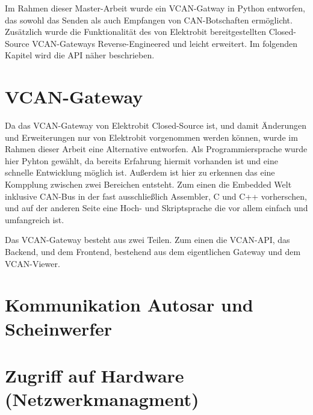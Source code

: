 \documentclass[
  a4paper,					    %
  twoside,
  DIV=calc,     				%
  bibliography=totoc,
  cleardoublepage=empty,
  ngerman,     					%
  final       					%
]{scrbook}
\begin{document}
Im Rahmen dieser Master-Arbeit wurde ein VCAN-Gatway in Python entworfen, das sowohl das Senden als auch Empfangen von CAN-Botschaften ermöglicht. Zusätzlich wurde die Funktionalität des von Elektrobit bereitgestellten Closed-Source VCAN-Gateways Reverse-Engineered und leicht erweitert. Im folgenden Kapitel wird die API näher beschrieben.



\section{VCAN-Gateway}
\label{sec:VCAN_Gateway}
Da das VCAN-Gateway von Elektrobit Closed-Source ist, und damit Änderungen und Erweiterungen nur von Elektrobit vorgenommen werden können, wurde im Rahmen dieser Arbeit eine Alternative entworfen. Als Programmiersprache wurde hier Pyhton gewählt, da bereits Erfahrung hiermit vorhanden ist und eine schnelle Entwicklung möglich ist. Außerdem ist hier zu erkennen das eine Kompplung zwischen zwei Bereichen entsteht. Zum einen die Embedded Welt inklusive CAN-Bus in der fast ausschließlich Assembler, C und C++ vorherschen, und auf der anderen Seite eine Hoch- und Skriptsprache die vor allem einfach und umfangreich ist.

Das VCAN-Gateway besteht aus zwei Teilen. Zum einen die VCAN-API, das Backend, und dem Frontend, bestehend aus dem eigentlichen Gateway und dem VCAN-Viewer.






\section{Kommunikation Autosar und Scheinwerfer}
\label{sec:Kommunikation_A_S}




\section{Zugriff auf Hardware (Netzwerkmanagment)}
\label{sec:AutosarNM}
\end{document}
